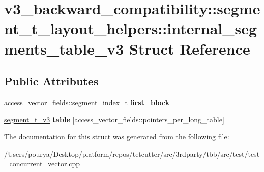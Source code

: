 \hypertarget{structv3__backward__compatibility_1_1segment__t__layout__helpers_1_1internal__segments__table__v3}{}\section{v3\+\_\+backward\+\_\+compatibility\+:\+:segment\+\_\+t\+\_\+layout\+\_\+helpers\+:\+:internal\+\_\+segments\+\_\+table\+\_\+v3 Struct Reference}
\label{structv3__backward__compatibility_1_1segment__t__layout__helpers_1_1internal__segments__table__v3}
\subsection*{Public Attributes}
\begin{DoxyCompactItemize}
\item 
\hypertarget{structv3__backward__compatibility_1_1segment__t__layout__helpers_1_1internal__segments__table__v3_a4530bf3e4e74f5dd937cf51beb717d0d}{}access\+\_\+vector\+\_\+fields\+::segment\+\_\+index\+\_\+t {\bfseries first\+\_\+block}\label{structv3__backward__compatibility_1_1segment__t__layout__helpers_1_1internal__segments__table__v3_a4530bf3e4e74f5dd937cf51beb717d0d}

\item 
\hypertarget{structv3__backward__compatibility_1_1segment__t__layout__helpers_1_1internal__segments__table__v3_a33b3ba6bfb4c0040e12cfcb66e51f9d0}{}\hyperlink{structv3__backward__compatibility_1_1segment__t__layout__helpers_1_1segment__t__v3}{segment\+\_\+t\+\_\+v3} {\bfseries table} \mbox{[}access\+\_\+vector\+\_\+fields\+::pointers\+\_\+per\+\_\+long\+\_\+table\mbox{]}\label{structv3__backward__compatibility_1_1segment__t__layout__helpers_1_1internal__segments__table__v3_a33b3ba6bfb4c0040e12cfcb66e51f9d0}

\end{DoxyCompactItemize}


The documentation for this struct was generated from the following file\+:\begin{DoxyCompactItemize}
\item 
/\+Users/pourya/\+Desktop/platform/repos/tetcutter/src/3rdparty/tbb/src/test/test\+\_\+concurrent\+\_\+vector.\+cpp\end{DoxyCompactItemize}
